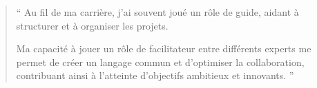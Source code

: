 \documentclass[10pt,a4paper,ragged2e,withhyper,normalphoto]{altacv}
\begin{document}


\makecvheader

\begin{quote}
``
Au fil de ma carrière, j’ai souvent joué un rôle de guide, aidant à structurer et à organiser les projets. 

Ma capacité à jouer un rôle de facilitateur entre différents experts me permet de créer un langage commun et d'optimiser la collaboration, contribuant ainsi à l'atteinte d'objectifs ambitieux et innovants.
''
\end{quote}
\end{document}
